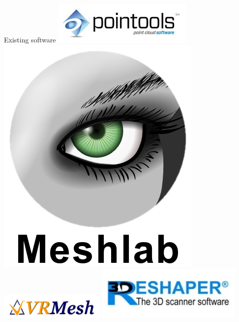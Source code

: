 \documentclass{beamer}
\begin{document}
\begin{frame}{Existing software}
\includegraphics[height=0.10\textheight]{pics/pointools.jpg}
\includegraphics[height=0.10\textheight]{pics/meshlab.png}
\includegraphics[height=0.10\textheight]{pics/vrmesh.png}
\includegraphics[height=0.10\textheight]{pics/3dreshaper.jpg}


\end{frame}
\end{document}
